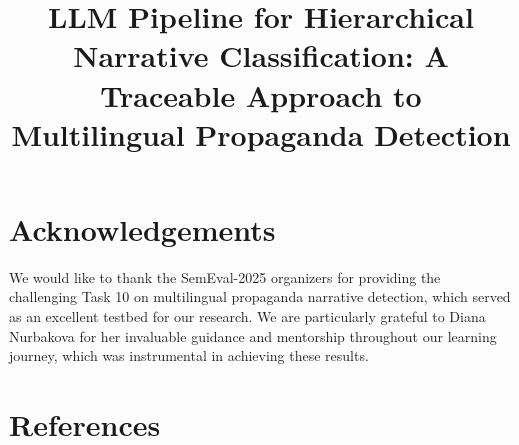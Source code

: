 \documentclass[10pt, a4paper]{article}
\title{LLM Pipeline for Hierarchical Narrative Classification: A Traceable Approach to Multilingual Propaganda Detection}
\begin{document}
\maketitleabstract










\section*{Acknowledgements}

We would like to thank the SemEval-2025 organizers for providing the challenging Task 10 on multilingual propaganda narrative detection, which served as an excellent testbed for our research. We are particularly grateful to Diana Nurbakova for her invaluable guidance and mentorship throughout our learning journey, which was instrumental in achieving these results.

\section*{References}



\end{document}
